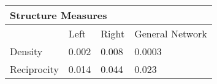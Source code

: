 \centering
\begin{tabular}{llll}
    \toprule\toprule
        \multicolumn{3}{l}{Structure Measures} \\
         \midrule   
        ~ & Left & Right & General Network \\ \midrule
        Density & 0.002 & 0.008 & 0.0003 \\ 
        Reciprocity & 0.014 & 0.044 & 0.023 \\ 
    \bottomrule\bottomrule
\end{tabular}